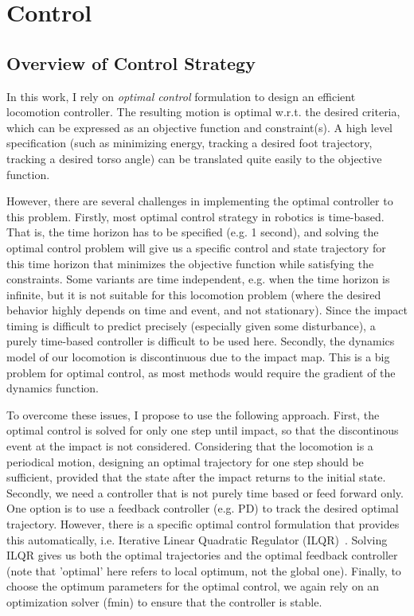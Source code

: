\section{Control}
\label{sec:control}


\subsection{Overview of Control Strategy}
\label{sec:overview}

In this work, I rely on \emph{optimal control} formulation to design an efficient locomotion controller. The resulting motion is optimal w.r.t. the desired criteria, which can be expressed as an objective function and constraint(s). A high level specification (such as minimizing energy, tracking a desired foot trajectory, tracking a desired torso angle) can be translated quite easily to the objective function. 

However, there are several challenges in implementing the optimal controller to this problem. Firstly, most optimal control strategy in robotics is time-based. That is, the time horizon has to be specified (e.g. 1 second), and solving the optimal control problem will give us a specific control and state trajectory for this time horizon that minimizes the objective function while satisfying the constraints. Some variants are time independent, e.g. when the time horizon is infinite, but it is not suitable for this locomotion problem (where the desired behavior highly depends on time and event, and not stationary). Since the impact timing is difficult to predict precisely (especially given some disturbance), a purely time-based controller is difficult to be used here. Secondly, the dynamics model of our locomotion is discontinuous due to the impact map. This is a big problem for optimal control, as most methods would require the gradient of the dynamics function. 

To overcome these issues, I propose to use the following approach. First, the optimal control is solved for only one step until impact, so that the discontinous event at the impact is not considered. Considering that the locomotion is a periodical motion, designing an optimal trajectory for one step should be sufficient, provided that the state after the impact returns to the initial state. 
Secondly, we need a controller that is not purely time based or feed forward only. One option is to use a feedback controller (e.g. PD) to track the desired optimal trajectory. However, there is a specific optimal control formulation that provides this automatically, i.e. Iterative Linear Quadratic Regulator (ILQR)~\cite{Tassa2012}. Solving ILQR gives us both the optimal trajectories and the optimal feedback controller (note that 'optimal' here refers to local optimum, not the global one). 
Finally, to choose the optimum parameters for the optimal control, we again rely on an optimization solver (fmin) to ensure that the controller is stable.

